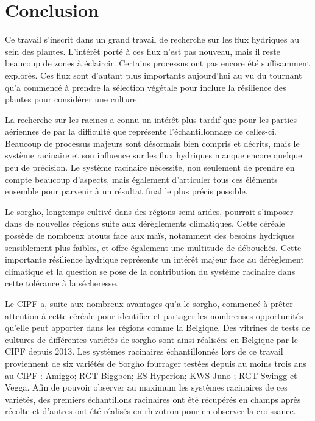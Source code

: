 \section{Conclusion}

Ce travail s'inscrit dans un grand travail de recherche sur les flux hydriques au sein des plantes.
L'intérêt porté à ces flux n'est pas nouveau, mais il reste beaucoup de zones à éclaircir.
Certains processus ont pas encore été suffisamment explorés.
Ces flux sont d'autant plus importants aujourd'hui au vu du tournant qu'a commencé à prendre la sélection végétale pour inclure la résilience des plantes pour considérer une culture.
\newline

La recherche sur les racines a connu un intérêt plus tardif que pour les parties aériennes de par la difficulté que représente l'échantillonnage de celles-ci.
Beaucoup de processus majeurs sont désormais bien compris et décrits, mais le système racinaire et son influence sur les flux hydriques manque encore quelque peu de précision.
Le système racinaire nécessite, non seulement de prendre en compte beaucoup d'aspects, mais également d'articuler tous ces éléments ensemble pour parvenir à un résultat final le plus précis possible.
\newline

Le sorgho, longtemps cultivé dans des régions semi-arides, pourrait s'imposer dans de nouvelles régions suite aux dérèglements climatiques.
Cette céréale possède de nombreux atouts face aux maïs, notamment des besoins hydriques sensiblement plus faibles, et offre également une multitude de débouchés.
Cette importante résilience hydrique représente un intérêt majeur face au dérèglement climatique et la question se pose de la contribution du système racinaire dans cette tolérance à la sécheresse.
\newline

Le CIPF a, suite aux nombreux avantages qu'a le sorgho, commencé à prêter attention à cette céréale pour identifier et partager les nombreuses opportunités qu'elle peut apporter dans les régions comme la Belgique.
Des vitrines de tests de cultures de différentes variétés de sorgho sont ainsi réalisées en Belgique par le CIPF depuis 2013.
Les systèmes racinaires échantillonnés lors de ce travail proviennent de six variétés de Sorgho fourrager testées depuis au moins trois ans au CIPF : Amiggo; RGT Biggben; ES Hyperion; KWS Juno ; RGT Swingg et Vegga.
Afin de pouvoir observer au maximum les systèmes racinaires de ces variétés, des premiers échantillons racinaires ont été récupérés en champs après récolte et d'autres ont été réalisés en rhizotron pour en observer la croissance.
\newline

